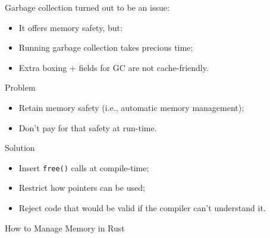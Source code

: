\documentclass[9pt]{beamer}
\renewcommand\big[1]{
  \begin{center}
    \Large{#1}
  \end{center}
}
\begin{document}
\begin{frame}
  \big{Garbage collection turned out to be an issue:}
  \begin{itemize}
    \item It offers memory safety, but:
    \item Running garbage collection takes precious time;
    \item Extra boxing + fields for GC are not cache-friendly.
  \end{itemize}
\end{frame}

\begin{frame}
  \big{Problem}
  \begin{itemize}
    \item Retain memory safety (i.e., automatic memory management);
    \item Don't pay for that safety at run-time.
  \end{itemize}
\end{frame}

\begin{frame}
  \big{Solution}
  \begin{itemize}
    \item Insert \texttt{free()} calls at compile-time;
    \item Restrict how pointers can be used;
    \item Reject code that would be valid if the compiler can't understand it.
  \end{itemize}
\end{frame}

\begin{frame}
\end{frame}


\begin{frame}
  \centering\Huge{How to Manage Memory in Rust}
\end{frame}
\end{document}

